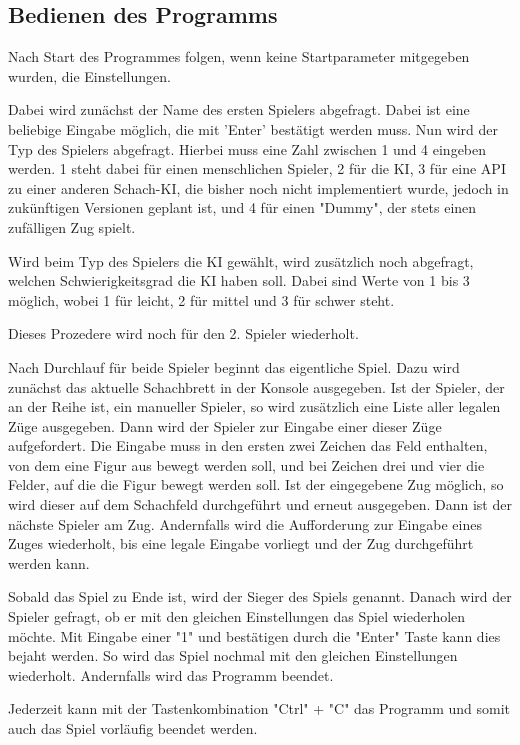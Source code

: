 \subsection{Bedienen des Programms}\label{bedienen-des-programms}

Nach Start des Programmes folgen, wenn keine Startparameter
mitgegeben wurden, die Einstellungen.

Dabei wird zunächst der Name des ersten Spielers abgefragt. Dabei ist
eine beliebige Eingabe möglich, die mit 'Enter' bestätigt werden muss.
Nun wird der Typ des Spielers abgefragt. Hierbei muss eine Zahl zwischen 1
und 4 eingeben werden. 1 steht dabei für einen menschlichen Spieler, 2
für die KI, 3 für eine API zu einer anderen Schach-KI, die bisher noch
nicht implementiert wurde, jedoch in zukünftigen Versionen geplant ist,
und 4 für einen "Dummy", der stets einen zufälligen Zug spielt.

Wird beim Typ des Spielers die KI gewählt, wird zusätzlich noch
abgefragt, welchen Schwierigkeitsgrad die KI haben soll. Dabei sind
Werte von 1 bis 3 möglich, wobei 1 für leicht, 2 für mittel und 3 für
schwer steht.

Dieses Prozedere wird noch für den 2. Spieler wiederholt.

Nach Durchlauf für beide Spieler beginnt das eigentliche Spiel. Dazu
wird zunächst das aktuelle Schachbrett in der Konsole ausgegeben. Ist
der Spieler, der an der Reihe ist, ein manueller Spieler, so wird
zusätzlich eine Liste aller legalen Züge ausgegeben. Dann wird der
Spieler zur Eingabe einer dieser Züge aufgefordert. Die Eingabe muss in
den ersten zwei Zeichen das Feld enthalten, von dem eine Figur aus
bewegt werden soll, und bei Zeichen drei und vier die Felder, auf die
die Figur bewegt werden soll. Ist der eingegebene Zug möglich, so wird
dieser auf dem Schachfeld durchgeführt und erneut ausgegeben. Dann ist
der nächste Spieler am Zug. Andernfalls wird die Aufforderung zur
Eingabe eines Zuges wiederholt, bis eine legale Eingabe
vorliegt und der Zug durchgeführt werden kann.

Sobald das Spiel zu Ende ist, wird der Sieger des Spiels genannt. Danach
wird der Spieler gefragt, ob er mit den gleichen Einstellungen das Spiel
wiederholen möchte. Mit Eingabe einer "1" und bestätigen durch
die "Enter" Taste kann dies bejaht werden. So wird das Spiel nochmal mit
den gleichen Einstellungen wiederholt. Andernfalls wird das Programm
beendet.

Jederzeit kann mit der Tastenkombination "Ctrl" + "C" das Programm und somit auch das Spiel vorläufig beendet werden.

